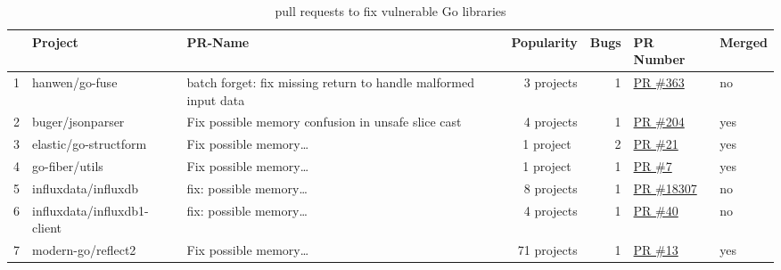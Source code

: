 \begin{table}[htp!]
    \centering
    \caption{\github{} pull requests to fix vulnerable Go libraries}
    \label{tbl:pull-requests}
    {\footnotesize
        \begin{tabularx}{\textwidth}{rlXrrll}
        {} & \textbf{Project}             & \textbf{PR-Name}                                                & \textbf{Popularity} & \textbf{Bugs} & \textbf{PR Number}                                                     & \textbf{Merged} \\
        \hline
        1  & hanwen/go-fuse               & batch forget: fix missing return to handle malformed input data &  3 projects         &  1            & \href{https://www.github.com/hanwen/go-fuse/pull/363}{PR \#363}        & no              \\
        \rowcolor{verylightgray}
        2  & buger/jsonparser             & Fix possible memory confusion in unsafe slice cast              &  4 projects         &  1            & \href{https://www.github.com/buger/jsonparser/pull/204}{PR \#204}      & yes             \\
        3  & elastic/go-structform        & Fix possible memory\ldots                                       &  1 project~         &  2            & \href{https://github.com/elastic/go-structform/pull/21}{PR \#21}       & yes             \\
        \rowcolor{verylightgray}
        4  & go-fiber/utils               & Fix possible memory\ldots                                       &  1 project~         &  1            & \href{https://github.com/gofiber/utils/pull/7}{PR \#7}                 & yes             \\
        5  & influxdata/influxdb          & fix: possible memory\ldots                                      &  8 projects         &  1            & \href{https://github.com/influxdata/influxdb/pull/18307}{PR \#18307}   & no              \\
        \rowcolor{verylightgray}
        6  & influxdata/influxdb1-client  & fix: possible memory\ldots                                      &  4 projects         &  1            & \href{https://github.com/influxdata/influxdb1-client/pull/40}{PR \#40} & no              \\
        7  & modern-go/reflect2           & Fix possible memory\ldots                                       & 71 projects         &  1            & \href{https://github.com/modern-go/reflect2/pull/13}{PR \#13}          & yes             \\

\end{tabularx}}
\end{table}
